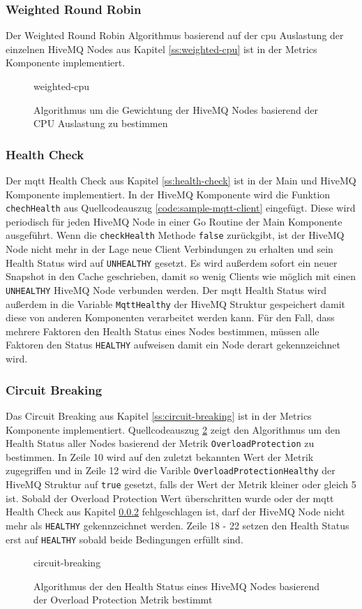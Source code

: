 \subsubsection{Weighted Round Robin}
Der Weighted Round Robin Algorithmus basierend auf der \ac{cpu} Auslastung der einzelnen HiveMQ Nodes aus Kapitel \ref{ss:weighted-cpu} ist in der Metrics Komponente implementiert.
\begin{figure}
    {weighted-cpu}
    \caption{Algorithmus um die Gewichtung der HiveMQ Nodes basierend der CPU Auslastung zu bestimmen}
    \label{code:weighted-cpu}
\end{figure}

\subsubsection{Health Check} \label{si:health-check}
Der \ac{mqtt} Health Check aus Kapitel \ref{ss:health-check} ist in der Main und HiveMQ Komponente implementiert. In der HiveMQ Komponente wird die Funktion \verb|chechHealth| aus Quellcodeauszug \ref{code:sample-mqtt-client} eingefügt. Diese wird periodisch für jeden HiveMQ Node in einer Go Routine der Main Komponente ausgeführt. Wenn die \verb|checkHealth| Methode \verb|false| zurückgibt, ist der HiveMQ Node nicht mehr in der Lage neue Client Verbindungen zu erhalten und sein Health Status wird auf \verb|UNHEALTHY| gesetzt. Es wird au{\ss}erdem sofort ein neuer Snapshot in den Cache geschrieben, damit so wenig Clients wie möglich mit einen \verb|UNHEALTHY| HiveMQ Node verbunden werden. Der \ac{mqtt} Health Status wird au{\ss}erdem in die Variable \verb|MqttHealthy| der HiveMQ Struktur gespeichert damit diese von anderen Komponenten verarbeitet werden kann. Für den Fall, dass mehrere Faktoren den Health Status eines Nodes bestimmen, müssen alle Faktoren den Status \verb|HEALTHY| aufweisen damit ein Node derart gekennzeichnet wird.

\subsubsection{Circuit Breaking}
Das Circuit Breaking aus Kapitel \ref{ss:circuit-breaking} ist in der Metrics Komponente implementiert. Quellcodeauszug \ref{code:circuit-breaking} zeigt den Algorithmus um den Health Status aller Nodes basierend der Metrik \verb|OverloadProtection| zu bestimmen. In Zeile 10 wird auf den zuletzt bekannten Wert der Metrik zugegriffen und in Zeile 12 wird die Varible \verb|OverloadProtectionHealthy| der HiveMQ Struktur auf \verb|true| gesetzt, falls der Wert der Metrik kleiner oder gleich 5 ist.
Sobald der Overload Protection Wert überschritten wurde oder der \ac{mqtt} Health Check aus Kapitel \ref{si:health-check} fehlgeschlagen ist, darf der HiveMQ Node nicht mehr als \verb|HEALTHY| gekennzeichnet werden. Zeile 18 - 22 setzen den Health Status erst auf \verb|HEALTHY| sobald beide Bedingungen erfüllt sind.
\begin{figure}
    {circuit-breaking}
    \caption{Algorithmus der den Health Status eines HiveMQ Nodes basierend der Overload Protection Metrik bestimmt}
    \label{code:circuit-breaking}
\end{figure}
\newpage

